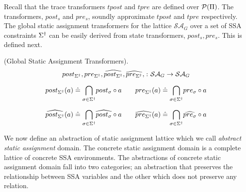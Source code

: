 Recall that the trace transformers $tpost$ and $tpre$ are defined over
$\mathcal{P}(\Pi)$. The transformers, $post_{s}$ and $pre_{s}$, soundly 
approximate $tpost$ and $tpre$ respectively.  
%
The global static assignment transformers for the lattice $\mathcal{SA}_G$ over 
a set of SSA constraints $\Sigma^\dagger$ can be easily derived from state
transformers, $post_s, pre_s$.  This is defined next.
%
\begin{definition} (Global Static Assignment Transformers). 
  \[ 
  post_{\Sigma^\dagger}, pre_{\Sigma^\dagger}, 
  \widehat{post_{\Sigma^\dagger}}, \widehat{pre_{\Sigma^\dagger}}, 
  \colon \mathcal{SA}_G \rightarrow \mathcal{SA}_G
  \]
    
  \[
  post_{\Sigma^\dagger}(a) \mathrel{\hat=} \underset{\sigma \in
  \Sigma^\dagger}{\bigcap} post_\sigma \circ a
  \qquad  
  pre_{\Sigma^\dagger}(a) \mathrel{\hat=} \underset{\sigma \in
  \Sigma^\dagger}{\bigcap} pre_\sigma \circ a
  \]
  
  \[
  \widehat{post_{\Sigma^\dagger}}(a) \mathrel{\hat=} \underset{\sigma \in
  \Sigma^\dagger}{\bigcap} \widehat{post_\sigma} \circ a
  \qquad   
  \widehat{pre_{\Sigma^\dagger}}(a) \mathrel{\hat=} \underset{\sigma \in
  \Sigma^\dagger}{\bigcap} \widehat{pre_\sigma} \circ a
  \]
\end{definition}
%
%
We now define an abstraction of static assignment lattice which we 
call \emph{abstract static assignment} domain. 
The concrete static assignment domain is a complete lattice of concrete 
SSA environments.  The abstractions of concrete static assignment domain fall
into two categories; an abstraction that preserves the relationship between 
SSA variables and the other which does not preserve any relation. 
%


